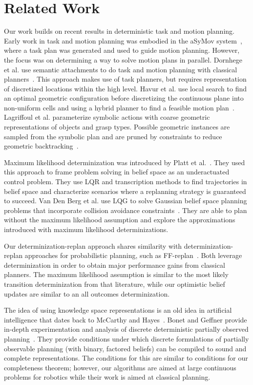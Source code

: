 \section{Related Work}
Our work builds on recent results in deterministic task and motion
planning. Early work in task and motion planning was embodied in the
aSyMov system~\cite{gravot2005asymov}, where a task plan was generated
and used to guide motion planning. However, the focus was on
determining a way to solve motion plans in parallel. Dornhege et
al. use semantic attachments to do task and motion planning with
classical planners~\cite{dornhege2012semantic}. This approach makes
use of task planners, but requires representation of discretized
locations within the high level. Havur et al. use local search to find an optimal geometric configuration before discretizing the continuous plane into non-uniform cells and using a hybrid planner to find a feasible motion plan~\cite{havur2014geometric}. Lagriffoul et al. parameterize symbolic actions with coarse geometric representations of objects and grasp types. Possible geometric instances are sampled from the symbolic plan and are pruned by constraints to reduce geometric backtracking~\cite{lagriffoul2014orientation}.

Maximum likelihood determinization was introduced by Platt et
al.~\cite{platt2010belief}. They used this approach to frame problem
solving in belief space as an underactuated control problem. They use
LQR and transcription methods to find trajectories in belief space and
characterize scenarios where a replanning strategy is guaranteed to
succeed. Van Den Berg et al. use LQG to solve Gaussian belief space
planning problems that incorporate collision avoidance
constraints~\cite{van2012motion}. They are able to plan without
the maximum likelihood assumption and explore the approximations
introduced with maximum likelihood determinizations.

Our determinization-replan approach shares similarity with
determinization-replan approaches for probabilistic planning, such as
FF-replan~\cite{yoon2007ff}. Both leverage determinization in order to
obtain major performance gains from classical planners. The maximum
likelihood assumption is similar to the most likely transition
determinization from that literature, while our optimistic belief
updates are similar to an all outcomes determinization.

The idea of using knowledge space representations is an old idea in
artificial intelligence that dates back to McCarthy and
Hayes~\cite{mccarthy1968some}. Bonet and Geffner provide in-depth
experimentation and analysis of discrete deterministic partially
observed planning~\cite{bonet2011planning}.  They provide conditions
under which discrete formulations of partially observable planning
(with binary, factored beliefs) can be compiled to sound and complete
representations. The conditions for this are similar to conditions
for our completeness theorem; however, our algorithms are aimed at
large continuous problems for robotics while their work is aimed at
classical planning.

